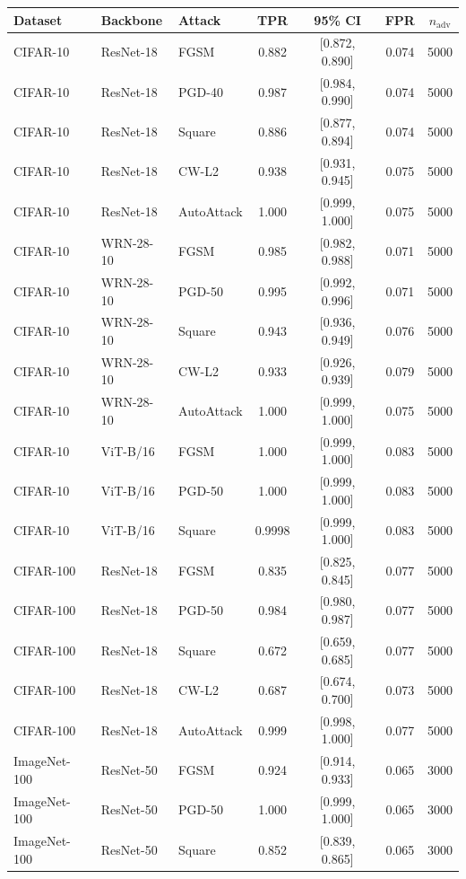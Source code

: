 \begin{tabular}{lllcccc}
\toprule
Dataset & Backbone & Attack & TPR & 95\% CI & FPR & $n_{\text{adv}}$ \\
\midrule
CIFAR-10  & ResNet-18  & FGSM       & 0.882 & [0.872, 0.890] & 0.074 & 5000 \\
CIFAR-10  & ResNet-18  & PGD-40     & 0.987 & [0.984, 0.990] & 0.074 & 5000 \\
CIFAR-10  & ResNet-18  & Square     & 0.886 & [0.877, 0.894] & 0.074 & 5000 \\
CIFAR-10  & ResNet-18  & CW-L2      & 0.938 & [0.931, 0.945] & 0.075 & 5000 \\
CIFAR-10  & ResNet-18  & AutoAttack & 1.000 & [0.999, 1.000] & 0.075 & 5000 \\
\midrule
CIFAR-10  & WRN-28-10  & FGSM       & 0.985 & [0.982, 0.988] & 0.071 & 5000 \\
CIFAR-10  & WRN-28-10  & PGD-50     & 0.995 & [0.992, 0.996] & 0.071 & 5000 \\
CIFAR-10  & WRN-28-10  & Square     & 0.943 & [0.936, 0.949] & 0.076 & 5000 \\
CIFAR-10  & WRN-28-10  & CW-L2      & 0.933 & [0.926, 0.939] & 0.079 & 5000 \\
CIFAR-10  & WRN-28-10  & AutoAttack & 1.000 & [0.999, 1.000] & 0.075 & 5000 \\
\midrule
CIFAR-10  & ViT-B/16   & FGSM       & 1.000 & [0.999, 1.000] & 0.083 & 5000 \\
CIFAR-10  & ViT-B/16   & PGD-50     & 1.000 & [0.999, 1.000] & 0.083 & 5000 \\
CIFAR-10  & ViT-B/16   & Square     & 0.9998 & [0.999, 1.000] & 0.083 & 5000 \\
\midrule
CIFAR-100 & ResNet-18  & FGSM       & 0.835 & [0.825, 0.845] & 0.077 & 5000 \\
CIFAR-100 & ResNet-18  & PGD-50     & 0.984 & [0.980, 0.987] & 0.077 & 5000 \\
CIFAR-100 & ResNet-18  & Square     & 0.672 & [0.659, 0.685] & 0.077 & 5000 \\
CIFAR-100 & ResNet-18  & CW-L2      & 0.687 & [0.674, 0.700] & 0.073 & 5000 \\
CIFAR-100 & ResNet-18  & AutoAttack & 0.999 & [0.998, 1.000] & 0.077 & 5000 \\
\midrule
ImageNet-100 & ResNet-50 & FGSM   & 0.924 & [0.914, 0.933] & 0.065 & 3000 \\
ImageNet-100 & ResNet-50 & PGD-50 & 1.000 & [0.999, 1.000] & 0.065 & 3000 \\
ImageNet-100 & ResNet-50 & Square & 0.852 & [0.839, 0.865] & 0.065 & 3000 \\
\bottomrule
\end{tabular}

